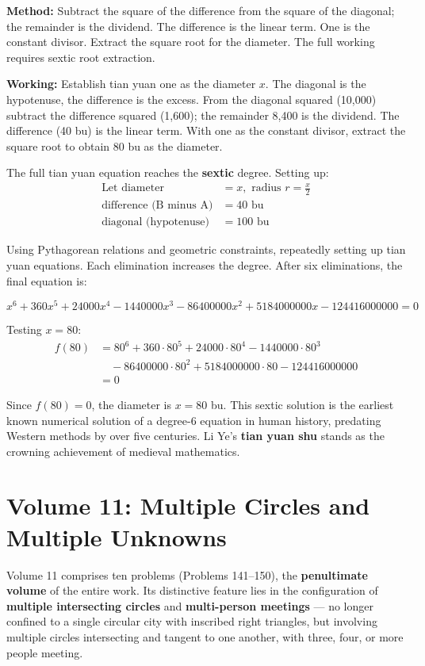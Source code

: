 \documentclass[11pt,a4paper]{book}
\newcommand{\method}[1]{\noindent\textbf{\color{methodcolor}Method: }#1\par}
\newcommand{\working}[1]{\noindent\textbf{\color{workcolor}Working: }#1\par}
\begin{document}
\method{Subtract the square of the difference from the square of the diagonal; the remainder is the dividend. The difference is the linear term. One is the constant divisor. Extract the square root for the diameter. The full working requires sextic root extraction.}

\working{Establish tian yuan one as the diameter $x$. The diagonal is the hypotenuse, the difference is the excess. From the diagonal squared (10,000) subtract the difference squared (1,600); the remainder 8,400 is the dividend. The difference (40 bu) is the linear term. With one as the constant divisor, extract the square root to obtain 80 bu as the diameter.

The full tian yuan equation reaches the \textbf{sextic} degree. Setting up:
\begin{align*}
\text{Let diameter } &= x, \text{ radius } r = \frac{x}{2} \\
\text{difference (B minus A)} &= 40 \text{ bu} \\
\text{diagonal (hypotenuse)} &= 100 \text{ bu}
\end{align*}

Using Pythagorean relations and geometric constraints, repeatedly setting up tian yuan equations. Each elimination increases the degree. After six eliminations, the final equation is:

$$x^6 + 360x^5 + 24000x^4 - 1440000x^3 - 86400000x^2 + 5184000000x - 124416000000 = 0$$

Testing $x = 80$:
\begin{align*}
f(80) &= 80^6 + 360 \cdot 80^5 + 24000 \cdot 80^4 - 1440000 \cdot 80^3 \\
&\quad - 86400000 \cdot 80^2 + 5184000000 \cdot 80 - 124416000000 \\
&= 0
\end{align*}

Since $f(80) = 0$, the diameter is $x = 80$ bu. This sextic solution is the earliest known numerical solution of a degree-6 equation in human history, predating Western methods by over five centuries. Li Ye's \textbf{tian yuan shu} stands as the crowning achievement of medieval mathematics.}

\newpage

\chapter{Volume 11: Multiple Circles and Multiple Unknowns}
\label{ch:vol11}

Volume 11 comprises ten problems (Problems 141--150), the \textbf{penultimate volume} of the entire work. Its distinctive feature lies in the configuration of \textbf{multiple intersecting circles} and \textbf{multi-person meetings} --- no longer confined to a single circular city with inscribed right triangles, but involving multiple circles intersecting and tangent to one another, with three, four, or more people meeting.
\end{document}
